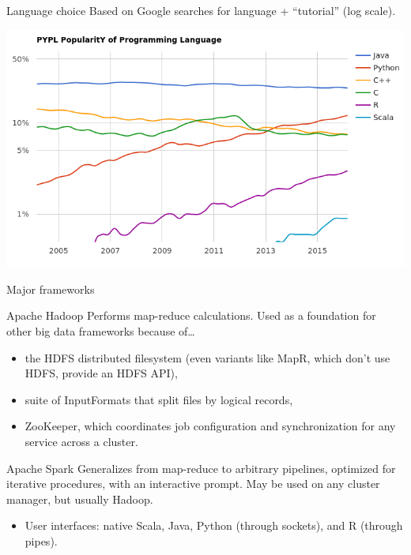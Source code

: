 \documentclass{beamer}
\begin{document}
\begin{frame}{Language choice}
Based on Google searches for language + ``tutorial'' (log scale).

\includegraphics[width=\linewidth]{language_trends.png}
\end{frame}

\begin{frame}{Major frameworks}
\begin{block}{Apache Hadoop}
Performs map-reduce calculations. Used as a foundation for other big data frameworks because of\ldots
\begin{itemize}
\item the HDFS distributed filesystem (even variants like MapR, which don't use HDFS, provide an HDFS API),
\item suite of InputFormats that split files by logical records,
\item ZooKeeper, which coordinates job configuration and synchronization for any service across a cluster.
\end{itemize}
\end{block}

\begin{block}{Apache Spark}
Generalizes from map-reduce to arbitrary pipelines, optimized for iterative procedures, with an interactive prompt. May be used on any cluster manager, but usually Hadoop.
\begin{itemize}
\item User interfaces: native Scala, Java, Python (through sockets), and R (through pipes).
\end{itemize}
\end{block}
\end{frame}
\end{document}
